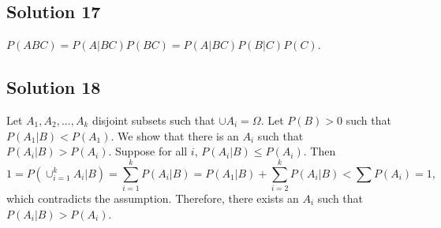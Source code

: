 \subsection*{Solution 17}

$P(ABC) = P(A|BC) P(BC) = P(A|BC) P(B|C) P(C)$.


\subsection*{Solution 18}

Let $A_1, A_2, ..., A_k$ disjoint subsets such that $\cup A_i = \Omega$.
Let $P(B) > 0$ such that $P(A_1|B) < P(A_1)$.
We show that there is an $A_i$ such that $P(A_i|B) > P(A_i)$.
Suppose for all $i$, $P(A_i|B) \leq P(A_i)$.
Then
\begin{equation*}
    1 = P(\cup_{i = 1}^k A_i|B)
        = \sum_{i = 1}^k P(A_i | B)
        = P(A_1 | B) + \sum_{i = 2}^k P(A_i | B)
        < \sum P(A_i)
        = 1,
\end{equation*}
which contradicts the assumption.
Therefore, there exists an $A_i$ such that $P(A_i|B) > P(A_i)$.
